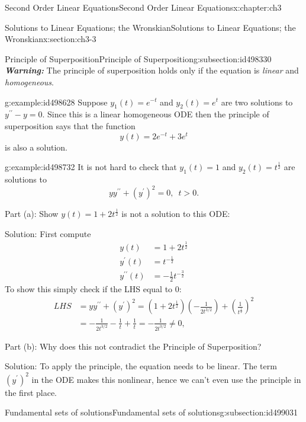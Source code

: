 \documentclass[oneside,10pt,]{book}
\newcommand{\alert}[1]{\textbf{\textit{#1}}}
\numberwithin{equation}{section}
\numberwithin{equation}{section}
\newcommand{\amp}{&}
\begin{document}
\begin{chapterptx}{Second Order Linear Equations}{}{Second Order Linear Equations}{}{}{x:chapter:ch3}
\begin{sectionptx}{Solutions to Linear Equations; the Wronskian}{}{Solutions to Linear Equations; the Wronskian}{}{}{x:section:ch3-3}
\begin{subsectionptx}{Principle of Superposition}{}{Principle of Superposition}{}{}{g:subsection:id498330}
\alert{Warning:} The principle of superposition holds only if the equation is \emph{linear} and \emph{homogeneous}.%
\begin{example}{}{g:example:id498628}%
Suppose \(y_{1}(t)=e^{-t}\) and \(y_{2}(t)=e^{t}\) are two solutions to \(y^{\prime\prime}-y=0\). Since this is a linear homogeneous ODE then the principle of superposition says that the function%
\begin{equation*}
y(t)=2e^{-t}+3e^{t}
\end{equation*}
is also a solution.%
\end{example}
\begin{example}{}{g:example:id498732}%
It is not hard to check that \(y_{1}(t)=1\) and \(y_{2}(t)=t^{\frac{1}{2}}\) are solutions to%
\begin{equation*}
yy^{\prime\prime}+\left(y^{\prime}\right)^{2}=0,\,\,\,t>0.
\end{equation*}
%
\par
Part (a): Show \(y(t)=1+2t^{\frac{1}{2}}\) is not a solution to this ODE:%
\par
Solution: First compute%
\begin{align*}
y(t) \amp =1+2t^{\frac{1}{2}}\\
y^{\prime}(t) \amp =t^{-\frac{1}{2}}\\
y^{\prime\prime}(t) \amp =-\frac{1}{2}t^{-\frac{3}{2}}
\end{align*}
To show this simply check if the LHS equal to \(0\):%
\begin{align*}
LHS \amp =yy^{\prime\prime}+\left(y^{\prime}\right)^{2}=\left(1+2t^{\frac{1}{2}}\right)\left(-\frac{1}{2t^{3/2}}\right)+\left(\frac{1}{t^{\frac{1}{2}}}\right)^{2}\\
\amp =-\frac{1}{2t^{3/2}}-\frac{1}{t}+\frac{1}{t}=-\frac{1}{2t^{3/2}}\neq0,
\end{align*}
%
\par
Part (b): Why does this not contradict the Principle of Superposition?%
\par
Solution: To apply the principle, the equation needs to be linear. The term \(\left(y^{\prime}\right)^{2}\) in the ODE makes this nonlinear, hence we can't even use the principle in the first place.%
\end{example}
\end{subsectionptx}
%
%
\typeout{************************************************}
\typeout{************************************************}
%
\begin{subsectionptx}{Fundamental sets of solutions}{}{Fundamental sets of solutions}{}{}{g:subsection:id499031}

\end{subsectionptx}
\end{sectionptx}
\end{chapterptx}
\end{document}
